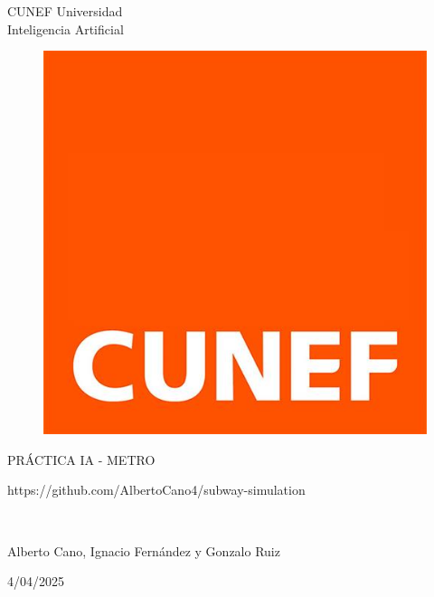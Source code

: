 \documentclass[a4paper,11pt,oneside]{book}
\begin{document}
    \frontmatter   
    
    
    \begin{titlepage}      
        \begin{center}
        
            {\LARGE CUNEF Universidad\\[0.5cm]
           Inteligencia Artificial}\\[2cm]
        \begin{figure}
			    \centering
			    \includegraphics[width=0.5\linewidth]{cunef.jpg}   
			\end{figure}
				
			
		
            \linespread{1.3}\huge {
                             
                PRÁCTICA IA - METRO
                
                https://github.com/AlbertoCano4/subway-simulation
                
            
            }
            \linespread{1}~\\[2cm]
			
            {\Large 
                
                Alberto Cano, 
                Ignacio Fernández y 
                Gonzalo Ruiz
                             
            }
            

            {\linespread{1.3}
        4/04/2025
            \vfill
            
            }
        \end{center}
    \end{titlepage}

    \newpage
    \thispagestyle{empty}
\end{document}
